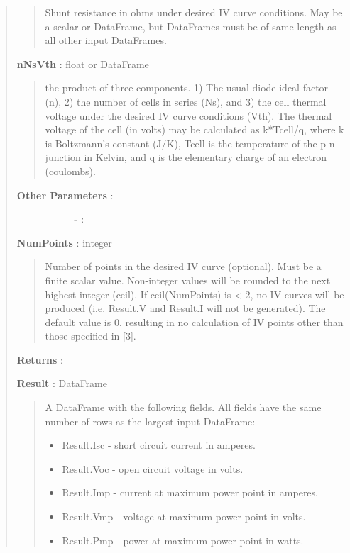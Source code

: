 \documentclass[letterpaper,10pt,english]{sphinxmanual}
\begin{document}
\begin{fulllineitems}
\begin{quote}
\begin{description}
\begin{quote}
Shunt resistance in ohms under desired IV curve conditions. May
be a scalar or DataFrame, but DataFrames must be of same length as all
other input DataFrames.
\end{quote}

\textbf{nNsVth} : float or DataFrame
\begin{quote}

the product of three components. 1) The usual diode ideal 
factor (n), 2) the number of cells in series (Ns), and 3) the cell 
thermal voltage under the desired IV curve conditions (Vth).
The thermal voltage of the cell (in volts) may be calculated as 
k*Tcell/q, where k is Boltzmann's constant (J/K), Tcell is the
temperature of the p-n junction in Kelvin, and q is the elementary 
charge of an electron (coulombs).
\end{quote}

\textbf{Other Parameters} :

\textbf{----------------} :

\textbf{NumPoints} : integer
\begin{quote}

Number of points in the desired IV curve (optional). Must be a finite 
scalar value. Non-integer values will be rounded to the next highest
integer (ceil). If ceil(NumPoints) is \textless{} 2, no IV curves will be produced
(i.e. Result.V and Result.I will not be generated). The default
value is 0, resulting in no calculation of IV points other than
those specified in {[}3{]}.
\end{quote}

\textbf{Returns} :

\textbf{Result} : DataFrame
\begin{quote}

A DataFrame with the following fields. All fields have the
same number of rows as the largest input DataFrame:
\begin{itemize}
\item {} 
Result.Isc -  short circuit current in amperes.

\item {} 
Result.Voc -  open circuit voltage in volts.

\item {} 
Result.Imp -  current at maximum power point in amperes.

\item {} 
Result.Vmp -  voltage at maximum power point in volts.

\item {} 
Result.Pmp -  power at maximum power point in watts.


\end{itemize}
\end{quote}
\end{description}
\end{quote}
\end{fulllineitems}
\end{document}
